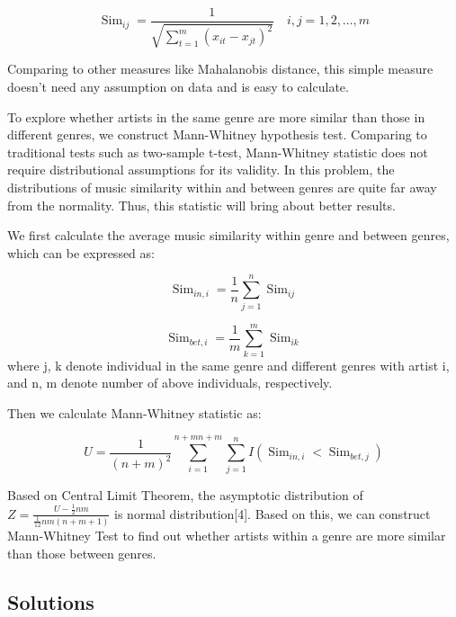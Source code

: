 \documentclass[12pt]{article}  %
\begin{document}
	\begin{equation}
		\operatorname{Sim}_{i j}=\frac{1}{\sqrt{\sum_{t=1}^{m}\left(x_{i t}-x_{j t}\right)^{2}}} \quad i, j=1,2, \ldots, m
	\end{equation}
	
	Comparing to other measures like Mahalanobis distance, this simple measure doesn’t need any assumption on data and is easy to calculate. 
	
	To explore whether artists in the same genre are more similar than those in different genres, we construct Mann-Whitney hypothesis test. Comparing to traditional tests such as two-sample t-test, Mann-Whitney statistic does not require distributional assumptions for its validity. In this problem, the distributions of music similarity within and between genres are quite far away from the normality. Thus, this statistic will bring about better results.
	
	We first calculate the average music similarity within genre and between genres, which can be expressed as:
	
	\begin{equation}
		\operatorname{Sim}_{i n, i}=\frac{1}{n} \sum_{j=1}^{n} \operatorname{Sim}_{i j}
	\end{equation}
	
	\begin{equation}
		\operatorname{Sim}_{b e t, i}=\frac{1}{m} \sum_{k=1}^{m} \operatorname{Sim}_{i k}
	\end{equation}
	where j, k denote individual in the same genre and different genres with artist i, and n, m denote number of above individuals, respectively.
	
	Then we calculate Mann-Whitney statistic as:
	
	\begin{equation}
		U=\frac{1}{(n+m)^{2}} \sum_{i=1}^{n+m n+m} \sum_{j=1}^{n} I\left(\operatorname{Sim}_{i n, i}<\operatorname{Sim}_{b e t, j}\right)
	\end{equation}
	
	Based on Central Limit Theorem, the asymptotic distribution of $Z=\frac{U-\frac{1}{2} n m}{\frac{1}{12} n m(n+m+1)}$ is normal distribution[4]. Based on this, we can construct Mann-Whitney Test to find out whether artists within a genre are more similar than those between genres.
	
	\subsection{Solutions}
	
\end{document}
